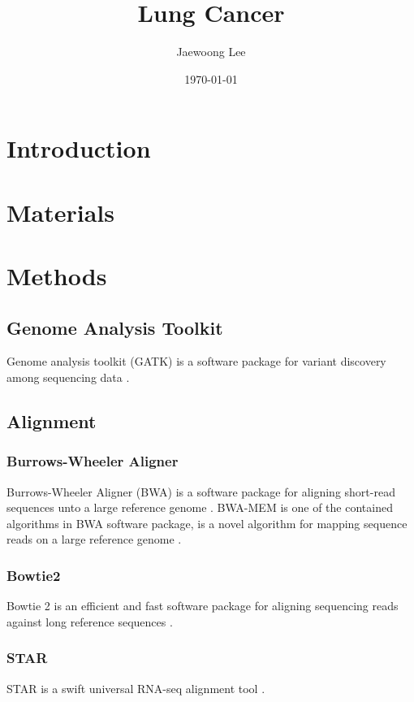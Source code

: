 \documentclass[a4paper]{article}
\title{Lung Cancer}
\author{
    Jaewoong Lee
}
\date{\today}
\begin{document}
    \maketitle
    \newpage

    \tableofcontents
    \listoftables
    \listoffigures
    \newpage

    \section{Introduction}

    \section{Materials}

    \section{Methods}
        \subsection{Genome Analysis Toolkit}
            Genome analysis toolkit (GATK) is a software package for variant discovery among sequencing data \cite{gatk1, gatk2}.

        \subsection{Alignment}
            \subsubsection{Burrows-Wheeler Aligner}
                Burrows-Wheeler Aligner (BWA) is a software package for aligning short-read sequences unto a large reference genome \cite{bwa1}. BWA-MEM is one of the contained algorithms in BWA software package, is a novel algorithm for mapping sequence reads on a large reference genome \cite{bwa2}.

            \subsubsection{Bowtie2}
                Bowtie 2 is an efficient and fast software package for aligning sequencing reads against long reference sequences \cite{bowtie1}.

            \subsubsection{STAR}
                STAR is a swift universal RNA-seq alignment tool \cite{star1}.
\end{document}
